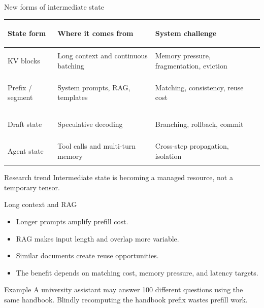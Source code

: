 \documentclass[aspectratio=169,11pt]{beamer}
\begin{document}
\begin{frame}{New forms of intermediate state}
  \begin{tabularx}{\textwidth}{>{\bfseries\raggedright\arraybackslash}p{2.5cm}YY}
    \toprule
    State form & Where it comes from & System challenge \\
    \midrule
    KV blocks & Long context and continuous batching & Memory pressure, fragmentation, eviction \\
    Prefix / segment & System prompts, RAG, templates & Matching, consistency, reuse cost \\
    Draft state & Speculative decoding & Branching, rollback, commit \\
    Agent state & Tool calls and multi-turn memory & Cross-step propagation, isolation \\
    \bottomrule
  \end{tabularx}
  \vspace{0.28cm}
  \begin{block}{Research trend}
    Intermediate state is becoming a managed resource, not a temporary tensor.
  \end{block}
\end{frame}

\begin{frame}{Long context and RAG}
  \begin{itemize}
    \item Longer prompts amplify prefill cost.
    \item RAG makes input length and overlap more variable.
    \item Similar documents create reuse opportunities.
    \item The benefit depends on matching cost, memory pressure, and latency targets.
  \end{itemize}
  \vspace{0.35cm}
  \begin{block}{Example}
    A university assistant may answer 100 different questions using the same handbook. Blindly recomputing the handbook prefix wastes prefill work.
  \end{block}
\end{frame}
\end{document}
